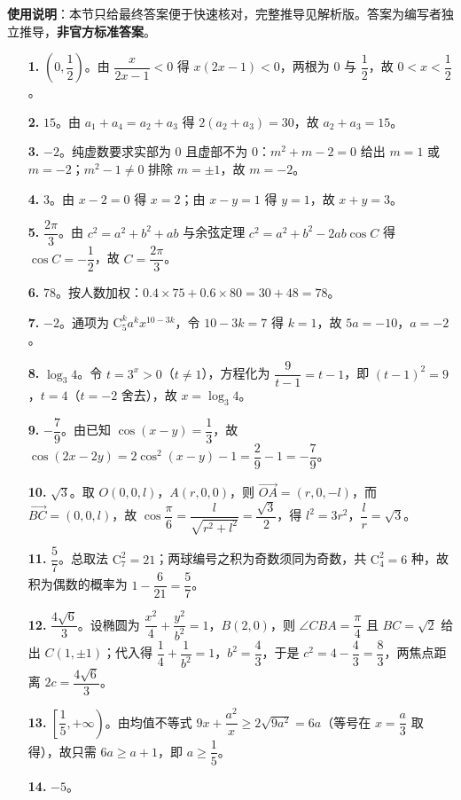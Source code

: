 
\begin{gknotice}
\textbf{使用说明}：本节只给最终答案便于快速核对，完整推导见解析版。答案为编写者独立推导，\textbf{非官方标准答案}。
\end{gknotice}

\begin{itemize}[leftmargin=2.6em]
  \item[\textbf{1.}] $\left(0,\dfrac12\right)$。由 $\dfrac{x}{2x-1}<0$ 得 $x(2x-1)<0$，两根为 $0$ 与 $\dfrac12$，故 $0<x<\dfrac12$。
  \item[\textbf{2.}] $15$。由 $a_1+a_4=a_2+a_3$ 得 $2(a_2+a_3)=30$，故 $a_2+a_3=15$。
  \item[\textbf{3.}] $-2$。纯虚数要求实部为 $0$ 且虚部不为 $0$：$m^2+m-2=0$ 给出 $m=1$ 或 $m=-2$；$m^2-1\neq0$ 排除 $m=\pm1$，故 $m=-2$。
  \item[\textbf{4.}] $3$。由 $x-2=0$ 得 $x=2$；由 $x-y=1$ 得 $y=1$，故 $x+y=3$。
  \item[\textbf{5.}] $\dfrac{2\pi}3$。由 $c^2=a^2+b^2+ab$ 与余弦定理 $c^2=a^2+b^2-2ab\cos C$ 得 $\cos C=-\dfrac12$，故 $C=\dfrac{2\pi}3$。
  \item[\textbf{6.}] $78$。按人数加权：$0.4\times75+0.6\times80=30+48=78$。
  \item[\textbf{7.}] $-2$。通项为 $\mathrm C_5^k a^k x^{10-3k}$，令 $10-3k=7$ 得 $k=1$，故 $5a=-10$，$a=-2$。
  \item[\textbf{8.}] $\log_3 4$。令 $t=3^x>0$（$t\neq1$），方程化为 $\dfrac{9}{t-1}=t-1$，即 $(t-1)^2=9$，$t=4$（$t=-2$ 舍去），故 $x=\log_3 4$。
  \item[\textbf{9.}] $-\dfrac79$。由已知 $\cos(x-y)=\dfrac13$，故 $\cos(2x-2y)=2\cos^2(x-y)-1=\dfrac29-1=-\dfrac79$。
  \item[\textbf{10.}] $\sqrt3$。取 $O(0,0,l)$，$A(r,0,0)$，则 $\overrightarrow{OA}=(r,0,-l)$，而 $\overrightarrow{BC}=(0,0,l)$，故 $\cos\dfrac\pi6=\dfrac{l}{\sqrt{r^2+l^2}}=\dfrac{\sqrt3}2$，得 $l^2=3r^2$，$\dfrac lr=\sqrt3$。
  \item[\textbf{11.}] $\dfrac57$。总取法 $\mathrm C_7^2=21$；两球编号之积为奇数须同为奇数，共 $\mathrm C_4^2=6$ 种，故积为偶数的概率为 $1-\dfrac6{21}=\dfrac57$。
  \item[\textbf{12.}] $\dfrac{4\sqrt6}3$。设椭圆为 $\dfrac{x^2}4+\dfrac{y^2}{b^2}=1$，$B(2,0)$，则 $\angle CBA=\dfrac\pi4$ 且 $BC=\sqrt2$ 给出 $C(1,\pm1)$；代入得 $\dfrac14+\dfrac1{b^2}=1$，$b^2=\dfrac43$，于是 $c^2=4-\dfrac43=\dfrac83$，两焦点距离 $2c=\dfrac{4\sqrt6}3$。
  \item[\textbf{13.}] $\left[\dfrac15,+\infty\right)$。由均值不等式 $9x+\dfrac{a^2}x\geqslant2\sqrt{9a^2}=6a$（等号在 $x=\dfrac a3$ 取得），故只需 $6a\geqslant a+1$，即 $a\geqslant\dfrac15$。
  \item[\textbf{14.}] $-5$。
\end{itemize}

